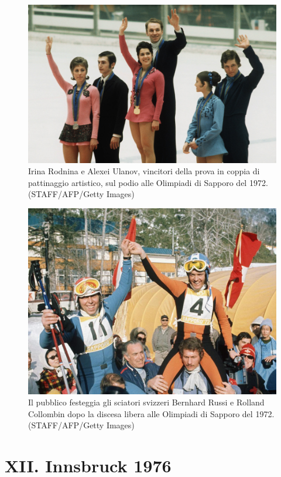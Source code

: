 \documentclass[
]{book}
\begin{document}
\begin{figure}
\includegraphics[height=0.8\textheight]{images/IlPost/1972} \caption{Irina Rodnina e Alexei Ulanov, vincitori della prova in coppia di pattinaggio artistico, sul podio alle Olimpiadi di Sapporo del 1972. (STAFF/AFP/Getty Images)}\label{fig:unnamed-chunk-35}
\end{figure}

\begin{figure}
\includegraphics[height=0.8\textheight]{images/IlPost/1972(2)} \caption{Il pubblico festeggia gli sciatori svizzeri Bernhard Russi e Rolland Collombin dopo la discesa libera alle Olimpiadi di Sapporo del 1972. (STAFF/AFP/Getty Images)}\label{fig:unnamed-chunk-36}
\end{figure}

\chapter*{XII. Innsbruck 1976}\label{xii.-innsbruck-1976}
\end{document}
